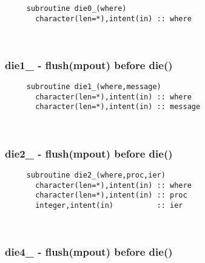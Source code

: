 \begin{verbatim} 
     subroutine die0_(where)
       character(len=*),intent(in) :: where
 \end{verbatim}%
 
 
\mbox{}\hrulefill\ 

  \subsubsection{die1\_ - flush(mpout) before die()}

\begin{verbatim} 
     subroutine die1_(where,message)
       character(len=*),intent(in) :: where
       character(len=*),intent(in) :: message
 \end{verbatim}%
 
 
\mbox{}\hrulefill\  

  \subsubsection{die2\_ - flush(mpout) before die()}

\begin{verbatim} 
     subroutine die2_(where,proc,ier)
       character(len=*),intent(in) :: where
       character(len=*),intent(in) :: proc
       integer,intent(in)          :: ier
 \end{verbatim}%
 
 
\mbox{}\hrulefill\ 

  \subsubsection{die4\_ - flush(mpout) before die()}

